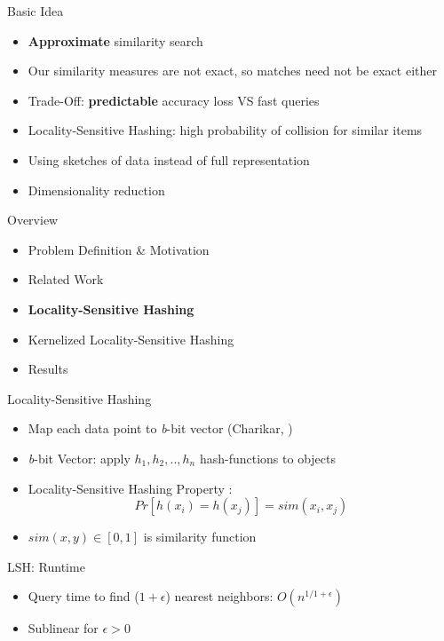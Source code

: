 \documentclass[12pt,a4paper]{beamer}
\begin{document}
\begin{frame}{Basic Idea}
\begin{itemize}
\item \textbf{Approximate} similarity search
\item Our similarity measures are not exact, so matches need not be exact either
\item Trade-Off: \textbf{predictable} accuracy loss VS fast queries
\item Locality-Sensitive Hashing: high probability of collision for similar items
\item Using sketches of data instead of full representation
\item Dimensionality reduction
\end{itemize}
\end{frame}

\begin{frame}{Overview}
\begin{itemize}
\item Problem Definition \& Motivation
\item Related Work
\item \textbf{Locality-Sensitive Hashing}
\item Kernelized Locality-Sensitive Hashing
\item Results
\end{itemize}
\end{frame}


\begin{frame}{Locality-Sensitive Hashing}
\begin{itemize}
\item Map each data point to \textit{b}-bit vector  (Charikar, \cite{lsh})
\item \textit{b}-bit Vector: apply $h_1,h_2,..,h_n$ hash-functions to objects
\item Locality-Sensitive Hashing Property \cite{lsh}: $$Pr[h(x_i)=h(x_j)]=sim(x_i,x_j)$$
\item $sim(x,y) \in [0,1]$ is similarity function
\end{itemize}
\end{frame}

\begin{frame}{LSH: Runtime}
\begin{itemize}
\item Query time to find ($1+\epsilon$) nearest neighbors: $O(n^{1/1+\epsilon})$
\item Sublinear for $\epsilon>0$
\end{itemize}
\end{frame}
\end{document}

